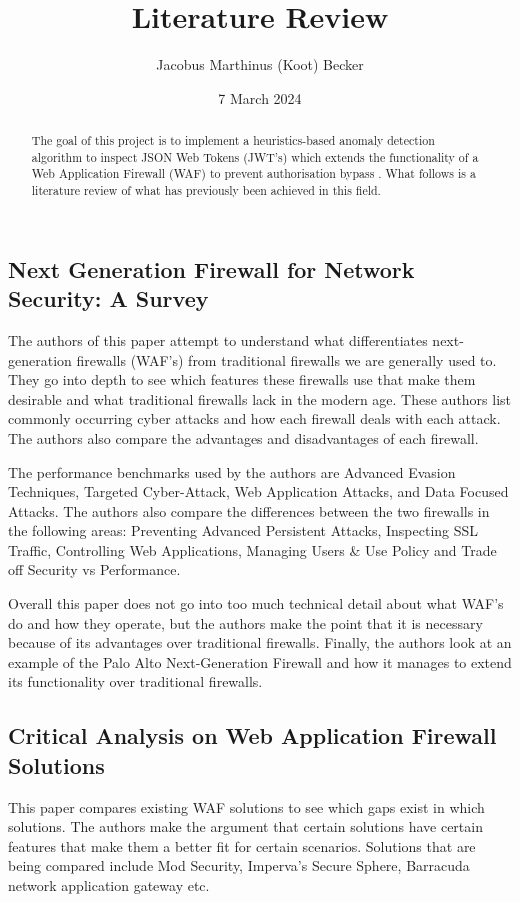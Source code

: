 \documentclass[a4paper, onecolumn, 12pt]{IEEEtran}
\title{Literature Review }
\author{Jacobus Marthinus (Koot) Becker}
\date{7 March 2024}
\begin{document}


\maketitle

\begin{abstract}
    The goal of this project is to implement a heuristics-based anomaly detection algorithm to inspect JSON Web Tokens (JWT's) which extends the functionality of a Web Application Firewall (WAF) to prevent authorisation bypass \cite{JAB2022}. What follows is a literature review of what has previously been achieved in this field.
\end{abstract}

\subsection{Next Generation Firewall for Network Security: A Survey \cite{8478973}}
    The authors of this paper attempt to understand what differentiates next-generation firewalls (WAF's) from traditional firewalls we are generally used to. They go into depth to see which features these firewalls use that make them desirable and what traditional firewalls lack in the modern age. These authors list commonly occurring cyber attacks and how each firewall deals with each attack. The authors also compare the advantages and disadvantages of each firewall.
    
    The performance benchmarks used by the authors are Advanced Evasion Techniques, Targeted Cyber-Attack, Web Application Attacks, and Data Focused Attacks. The authors also compare the differences between the two firewalls in the following areas: Preventing Advanced Persistent Attacks, Inspecting SSL Traffic, Controlling Web Applications, Managing Users \& Use Policy and Trade off Security vs Performance.
    
    Overall this paper does not go into too much technical detail about what WAF's do and how they operate, but the authors make the point that it is necessary because of its advantages over traditional firewalls. Finally, the authors look at an example of the Palo Alto Next-Generation Firewall and how it manages to extend its functionality over traditional firewalls.



\subsection{Critical Analysis on Web Application Firewall Solutions \cite{6513431}}
    This paper compares existing WAF solutions to see which gaps exist in which solutions. The authors make the argument that certain solutions have certain features that make them a better fit for certain scenarios. Solutions that are being compared include Mod Security, Imperva's Secure Sphere, Barracuda network application gateway etc. 
\end{document}
